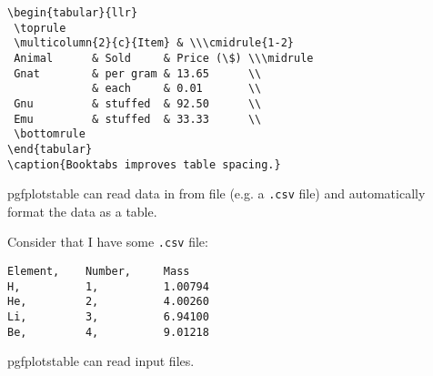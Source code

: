 \begin{frame}[fragile]{\href{https://ctan.org/pkg/booktabs?lang=en}%
                            {}}
  \begin{lstlisting}
\begin{tabular}{llr}
 \toprule
 \multicolumn{2}{c}{Item} & \\\cmidrule{1-2}
 Animal      & Sold     & Price (\$) \\\midrule
 Gnat        & per gram & 13.65      \\
             & each     & 0.01       \\
 Gnu         & stuffed  & 92.50      \\
 Emu         & stuffed  & 33.33      \\
 \bottomrule
\end{tabular}
\caption{Booktabs improves table spacing.}
  \end{lstlisting}
\end{frame}

\begin{frame}[fragile]{\href{https://ctan.org/pkg/pgfplotstable?lang=en}%
                            {}}
  pgfplotstable can read data in from file (e.g. a \texttt{.csv} file) and
  automatically format the data as a table.

  Consider that I have some \texttt{.csv} file:
  \begin{lstlisting}
Element,    Number,     Mass
H,          1,          1.00794
He,         2,          4.00260
Li,         3,          6.94100
Be,         4,          9.01218
  \end{lstlisting}
\end{frame}

\begin{frame}[fragile]{\href{https://ctan.org/pkg/pgfplotstable?lang=en}%
                            {}}
  \begin{table}
    \caption{pgfplotstable can read input files.}
  \end{table}
\end{frame}

